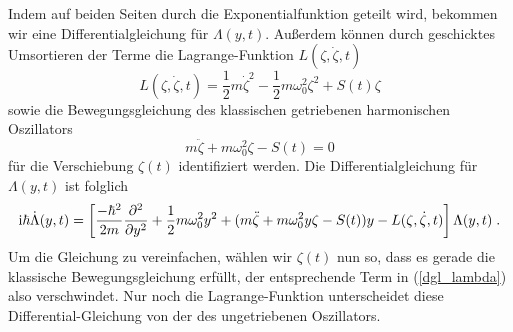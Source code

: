 
      Indem auf beiden Seiten durch die Exponentialfunktion geteilt wird, bekommen wir eine Differentialgleichung für $\Lambda(y,t)$.
      Außerdem können durch geschicktes Umsortieren der Terme die Lagrange-Funktion $L(\zeta,\dot \zeta, t)$
      \begin{equation}
        L(\zeta,\dot \zeta, t) = \frac{1}{2}m\dot \zeta^2 - \frac{1}{2}m\omega_0^2\zeta^2 + S(t)\zeta
        \label{lagrange_zeta}
      \end{equation}
        sowie die Bewegungsgleichung des klassischen getriebenen harmonischen  Oszillators \cite{husimi}
        \begin{equation}
          m\ddot \zeta + m\omega_0^2\zeta - S(t) = 0
          \label{dgl_zeta}
        \end{equation}
      für die Verschiebung $\zeta(t)$ identifiziert werden.
      Die Differentialgleichung für $\Lambda(y,t)$ ist folglich
      \begin{equation}
        \text i \hbar \dot \Lambda(y,t) = \left[ \frac{-\hbar^2}{2m}\frac{\partial^2}{\partial y^2} + \frac{1}{2}m\omega_0^2y^2 + (m\ddot \zeta + m\omega_0^2y\zeta - S(t))y - L(\zeta,\dot \zeta, t) \right]\Lambda(y,t) \; .
        \label{dgl_lambda}
      \end{equation}
      Um die Gleichung zu vereinfachen, wählen wir $\zeta(t)$ nun so, dass es gerade die klassische Bewegungsgleichung erfüllt, der entsprechende Term in (\ref{dgl_lambda}) also verschwindet.
      Nur noch die Lagrange-Funktion unterscheidet diese Differential-Gleichung von der des ungetriebenen Oszillators.

